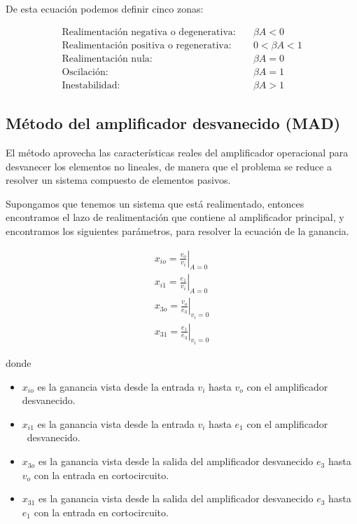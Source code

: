 De esta ecuación podemos definir cinco zonas:

\begin{align*}
\text{Realimentación negativa o degenerativa:} & \quad \beta A < 0 \\
\text{Realimentación positiva o regenerativa:} & \quad 0 < \beta A < 1 \\
\text{Realimentación nula:} & \quad \beta A = 0 \\
\text{Oscilación:} & \quad \beta A = 1 \\
\text{Inestabilidad:} & \quad \beta A > 1
\end{align*}

\subsection{Método del amplificador desvanecido (MAD)}

 El método aprovecha las características reales del
amplificador operacional para desvanecer los elementos no lineales, de manera que el problema se reduce a resolver un sistema compuesto de elementos pasivos.

Supongamos que tenemos un sistema que está realimentado, entonces encontramos el lazo de realimentación que contiene al amplificador principal,
y encontramos los siguientes parámetros, para resolver la ecuación de la ganancia.


\begin{align*}
    x_{io} = \left. \frac{v_o}{v_i} \right|_{A=0} \\
    x_{i1} = \left. \frac{e_1}{v_i} \right|_{A=0} \\
    x_{3o} = \left. \frac{v_o}{e_3} \right|_{v_i=0} \\
    x_{31} = \left. \frac{e_1}{e_3} \right|_{v_i=0}
\end{align*}

donde

\begin{itemize}
    \item $x_{io}$ es la ganancia vista desde la entrada $v_i$ hasta $v_o$ con el amplificador
desvanecido.
    \item $x_{i1}$ es la ganancia vista desde la entrada $v_i$ hasta $e_1$ con el amplificador \
desvanecido.
    \item $x_{3o}$ es la ganancia vista desde la salida del amplificador desvanecido $e_3$
hasta $v_o$ con la entrada en cortocircuito.
    \item $x_{31}$ es la ganancia vista desde la salida del amplificador desvanecido $e_3$
hasta $e_1$ con la entrada en cortocircuito.
\end{itemize}

